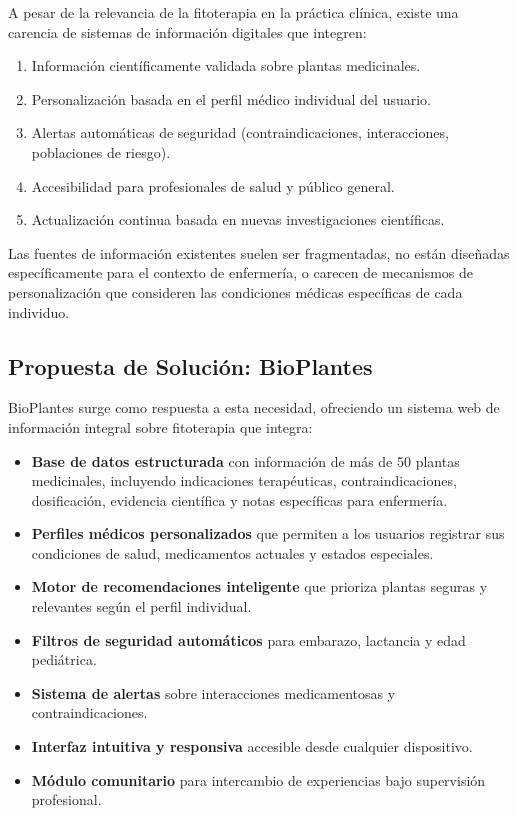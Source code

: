 \documentclass[12pt,a4paper]{article}
\begin{document}
A pesar de la relevancia de la fitoterapia en la práctica clínica, existe una carencia de sistemas de información digitales que integren:

\begin{enumerate}
    \item Información científicamente validada sobre plantas medicinales.
    \item Personalización basada en el perfil médico individual del usuario.
    \item Alertas automáticas de seguridad (contraindicaciones, interacciones, poblaciones de riesgo).
    \item Accesibilidad para profesionales de salud y público general.
    \item Actualización continua basada en nuevas investigaciones científicas.
\end{enumerate}

Las fuentes de información existentes suelen ser fragmentadas, no están diseñadas específicamente para el contexto de enfermería, o carecen de mecanismos de personalización que consideren las condiciones médicas específicas de cada individuo.

\subsection{Propuesta de Solución: BioPlantes}

BioPlantes surge como respuesta a esta necesidad, ofreciendo un sistema web de información integral sobre fitoterapia que integra:

\begin{itemize}
    \item \textbf{Base de datos estructurada} con información de más de 50 plantas medicinales, incluyendo indicaciones terapéuticas, contraindicaciones, dosificación, evidencia científica y notas específicas para enfermería.
    \item \textbf{Perfiles médicos personalizados} que permiten a los usuarios registrar sus condiciones de salud, medicamentos actuales y estados especiales.
    \item \textbf{Motor de recomendaciones inteligente} que prioriza plantas seguras y relevantes según el perfil individual.
    \item \textbf{Filtros de seguridad automáticos} para embarazo, lactancia y edad pediátrica.
    \item \textbf{Sistema de alertas} sobre interacciones medicamentosas y contraindicaciones.
    \item \textbf{Interfaz intuitiva y responsiva} accesible desde cualquier dispositivo.
    \item \textbf{Módulo comunitario} para intercambio de experiencias bajo supervisión profesional.
\end{itemize}
\end{document}
